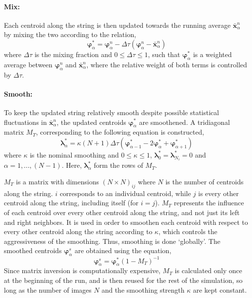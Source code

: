 \documentclass{article}
\begin{document}
\paragraph*{Mix:}

Each centroid along the string is then updated towards the running average $\bm{\bar{x}}_{\alpha}^n$ by mixing the two according to the relation,
%
\begin{equation} \label{eq:25}
\bm{\varphi}_{\alpha}^* = \bm{\varphi}_{\alpha}^n - \Delta \tau (\bm{\varphi}_{\alpha}^n - \bm{\bar{x}}_{\alpha}^n)
\end{equation}
%
where $\Delta \tau$ is the mixing fraction and $0 \leq \Delta \tau \leq 1$, such that $\bm{\varphi}_{\alpha}^*$ is a weighted average between $\bm{\varphi}_{\alpha}^n$ and $\bm{\bar{x}}_{\alpha}^n$, where the relative weight of both terms is controlled by $\Delta \tau$.

\paragraph*{Smooth:}

To keep the updated string relatively smooth despite possible statistical fluctuations in $\bm{\bar{x}}_{\alpha}^n$, the updated centroids $\bm{\varphi}_{\alpha}^*$ are smoothened. A tridiagonal matrix $M_T$, corresponding to the following equation is constructed,
%
\begin{equation} \label{eq:26}
\bm{\lambda}_{\alpha}^* = \kappa (N+1) \Delta \tau (\bm{\varphi}_{\alpha-1}^* -2 \bm{\varphi}_{\alpha}^*+ \bm{\varphi}_{\alpha+1}^* )
\end{equation}
%
where $\kappa$ is the nominal smoothing and $0 \leq \kappa \leq 1$, $\bm{\lambda}_{0}^* = \bm{\lambda}_{N_i}^* = 0$ and $\alpha=1,...,(N -1)$. Here, $\bm{\lambda}_{\alpha}^*$ form the rows of $M_T$.

$M_T$ is a matrix with dimensions $(N \times N)_{ij}$ where $N$ is the number of centroids along the string. $i$ corresponds to an individual centroid, while $j$ is every other centroid along the string, including itself (for $i=j$). $M_T$ represents the influence of each centroid over every other centroid along the string, and not just its left and right neighbors. It is used in order to smoothen each centroid with respect to every other centroid along the string according to $\kappa$, which controls the aggressiveness of the smoothing. Thus, smoothing is done \enquote*{globally}. The smoothed centroids $\bm{\varphi}_{\alpha}^s$ are obtained using the equation,
%
\begin{equation} \label{eq:27}
\bm{\varphi}_{\alpha}^s = \bm{\varphi}_{\alpha}^* (1 - M_T)^{-1}
\end{equation}
% 
Since matrix inversion is computationally expensive, $M_T$ is calculated only once at the beginning of the run, and is then reused for the rest of the simulation, so long as the number of images $N$ and the smoothing strength $\kappa$ are kept constant.
\end{document}
